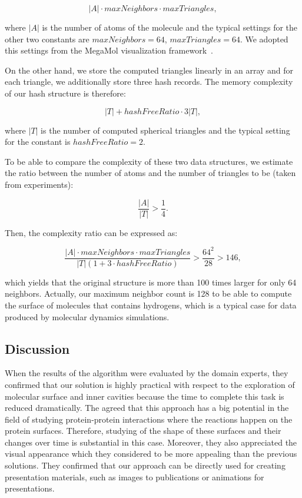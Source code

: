 \begin{equation}
|A| \cdot maxNeighbors \cdot maxTriangles,
\end{equation}

where $|A|$ is the number of atoms of the molecule and the typical settings for the other two constants are $maxNeighbors = 64$, $maxTriangles = 64$.
We adopted this settings from the MegaMol visualization framework~\cite{grottel2015megamol}.

On the other hand, we store the computed triangles linearly in an array and for each triangle, we additionally store three hash records. 
The memory complexity of our hash structure is therefore:

\begin{equation}
|T| + hashFreeRatio \cdot 3 |T|,
\end{equation}

where $|T|$ is the number of computed spherical triangles and the typical setting for the constant is $hashFreeRatio = 2$. 

To be able to compare the complexity of these two data structures, we estimate the ratio between the number of atoms and the number of triangles to be (taken from experiments):

\begin{equation}
\frac{|A|}{|T|} > \frac{1}{4}.
\end{equation}

Then, the complexity ratio can be expressed as:

\begin{equation}
\frac{|A| \cdot maxNeighbors \cdot maxTriangles}{|T|(1 + 3 \cdot hashFreeRatio)} > \frac{64^2}{28} > 146,
\end{equation}

which yields that the original structure is more than 100 times larger for only 64 neighbors.
Actually, our maximum neighbor count is 128 to be able to compute the surface of molecules that contains hydrogens, which is a typical case for data produced by molecular dynamics simulations.


\subsection{Discussion}
When the results of the algorithm were evaluated by the domain experts, they confirmed that our solution is highly practical with respect to the exploration of molecular surface and inner cavities because the time to complete this task is reduced dramatically.
The agreed that this approach has a big potential in the field of studying protein-protein interactions where the reactions happen on the protein surfaces.
Therefore, studying of the shape of these surfaces and their changes over time is substantial in this case.
Moreover, they also appreciated the visual appearance which they considered to be more appealing than the previous solutions.
They confirmed that our approach can be directly used for creating presentation materials, such as images to publications or animations for presentations.

